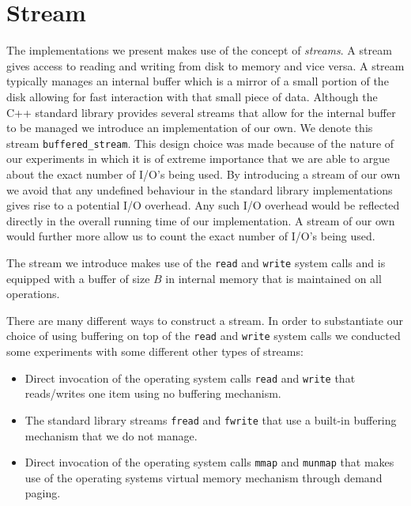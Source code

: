 \documentclass[twoside,11pt,openright]{report}
\begin{document}
\section{Stream}
The implementations we present makes use of the concept of \textit{streams}. A stream gives access to reading and writing from disk to memory and vice versa. A stream typically manages an internal buffer which is a mirror of a small portion of the disk allowing for fast interaction with that small piece of data. Although the C++ standard library provides several streams that allow for the internal buffer to be managed we introduce an implementation of our own. We denote this stream \texttt{buffered\_stream}. This design choice was made because of the nature of our experiments in which it is of extreme importance that we are able to argue about the exact number of I/O's being used. By introducing a stream of our own we avoid that any undefined behaviour in the standard library implementations gives rise to a potential I/O overhead. Any such I/O overhead would be reflected directly in the overall running time of our implementation. A stream of our own would further more allow us to count the exact number of I/O's being used.

The stream we introduce makes use of the \texttt{read} and \texttt{write} system calls and is equipped with a buffer of size $B$ in internal memory that is maintained on all operations.

There are many different ways to construct a stream. In order to substantiate our choice of using buffering on top of the \texttt{read} and \texttt{write} system calls we conducted some experiments with some different other types of streams:

\begin{itemize}
	\item Direct invocation of the operating system calls \texttt{read} and \texttt{write} that reads\-/writes one item using no buffering mechanism.
	\item The standard library streams \texttt{fread} and \texttt{fwrite} that use a built\--in buffering mechanism that we do not manage.
	\item Direct invocation of the operating system calls \texttt{mmap} and \texttt{munmap} that makes use of the operating systems virtual memory mechanism through demand paging.
\end{itemize}
\end{document}
